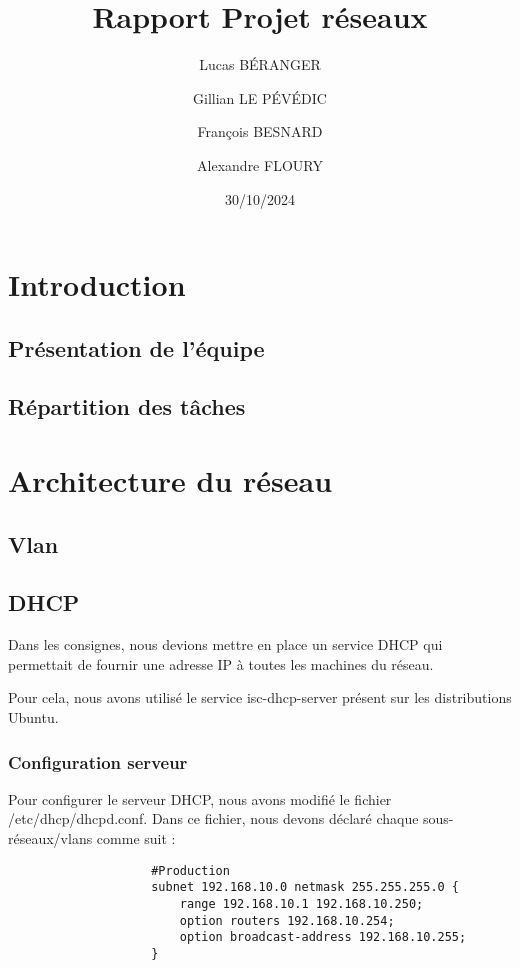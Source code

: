 \documentclass[a4paper,12pt]{report}
\title{Rapport Projet réseaux}
\author{
    Lucas BÉRANGER \and 
    Gillian LE PÉVÉDIC \and
    François BESNARD \and
    Alexandre FLOURY \and
}
\date{30/10/2024}
\begin{document}
    \maketitle  
    \newpage

    \tableofcontents
    \newpage

    \chapter{Introduction}
        \section{Présentation de l'équipe}
        \section{Répartition des tâches}


    \chapter{Architecture du réseau}
        \section{Vlan}
        \section{DHCP}
            Dans les consignes, nous devions mettre en place un service DHCP qui permettait de fournir une adresse IP à toutes les machines du réseau. 
            
            Pour cela, nous avons utilisé le service isc-dhcp-server présent sur les distributions Ubuntu.
            \subsection{Configuration serveur}
                Pour configurer le serveur DHCP, nous avons modifié le fichier /etc/dhcp/dhcpd.conf. 
                Dans ce fichier, nous devons déclaré chaque sous-réseaux/vlans comme suit :
                
                    \begin{verbatim}
                    #Production
                    subnet 192.168.10.0 netmask 255.255.255.0 {
                        range 192.168.10.1 192.168.10.250;
                        option routers 192.168.10.254;
                        option broadcast-address 192.168.10.255;
                    }
                    \end{verbatim}
                
\end{document}
